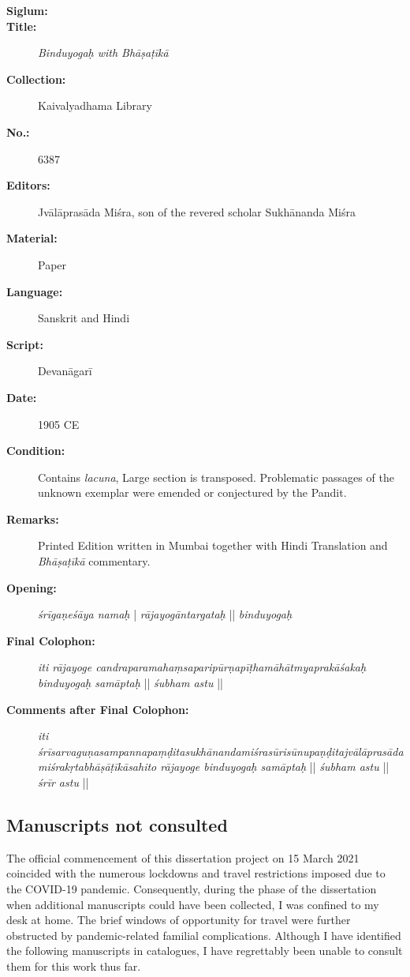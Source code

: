 \begin{description}
\item[\textbf{Siglum:}] \Huge{} \nocite{ytbe}
\item[\textbf{Title:}] \emph{Binduyogaḥ with Bhāṣaṭīkā}
\item[\textbf{Collection:}] Kaivalyadhama Library
\item[\textbf{No.:}] 6387
\item[\textbf{Editors:}] Jvālāprasāda Miśra, son of the revered scholar Sukhānanda Miśra
\item[\textbf{Material:}] Paper
\item[\textbf{Language:}] Sanskrit and Hindi
\item[\textbf{Script:}] Devanāgarī
\item[\textbf{Date:}] 1905 CE
\item[\textbf{Condition:}] Contains \textit{lacuna}, Large section is transposed. Problematic passages of the unknown exemplar were emended or conjectured by the Pandit.  
\item[\textbf{Remarks:}] Printed Edition written in Mumbai together with Hindi Translation and \emph{Bhāṣaṭīkā} commentary. 
\item[\textbf{Opening:}] \textit{śrīgaṇeśāya namaḥ} | \textit{rājayogāntargataḥ} || \textit{binduyogaḥ} 
\item[\textbf{Final Colophon:}] \textit{iti rājayoge candraparamahaṃsaparipūrṇapīṭhamāhātmyaprakāśakaḥ binduyogaḥ samāptaḥ} || \textit{śubham astu} ||  
\item[\textbf{Comments after Final Colophon:}] \textit{iti śrīsarvaguṇasampannapaṃḍitasukhānandamiśrasūrisūnupaṇḍitajvālāprasādamiśrakṛtabhāṣāṭīkāsahito rājayoge binduyogaḥ samāptaḥ} || \textit{śubham astu} || \textit{śrīr astu} ||
\end{description}
\newpage

\subsection{Manuscripts not consulted}

The official commencement of this dissertation project on 15 March 2021 coincided with the numerous lockdowns and travel restrictions imposed due to the COVID-19 pandemic. Consequently, during the phase of the dissertation when additional manuscripts could have been collected, I was confined to my desk at home. The brief windows of opportunity for travel were further obstructed by pandemic-related familial complications. Although I have identified the following manuscripts in catalogues, I have regrettably been unable to consult them for this work thus far.

